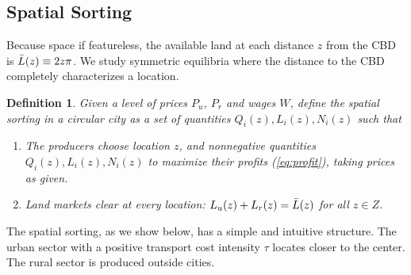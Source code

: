 \documentclass[12pt]{article}
\newtheorem{definition}{Definition}
\begin{document}
\subsection{Spatial Sorting}
Because space if featureless, the available land at each distance $z$ from the CBD is $\Bar L(z) \equiv 2z\pi$. We study symmetric equilibria where the distance to the CBD completely characterizes a location.

\begin{definition}
Given a level of prices $P_u$, $P_r$ and wages $W$, define the \emph{spatial sorting} in a circular city as a set of quantities $Q_i(z), L_i(z), N_i(z)$ such that
\begin{enumerate}
    \item The producers choose location $z$, and nonnegative quantities $Q_i(z), L_i(z), N_i(z)$ to maximize their profits (\ref{eq:profit}), taking prices as given.
    \item Land markets clear at every location: $L_u(z)+L_r(z)=\Bar L(z)$ for all $z\in Z$.
\end{enumerate}
\end{definition}
The spatial sorting, as we show below, has a simple and intuitive structure. The urban sector with a positive transport cost intensity $\tau$ locates closer to the center. The rural sector is produced outside cities.
\end{document}
